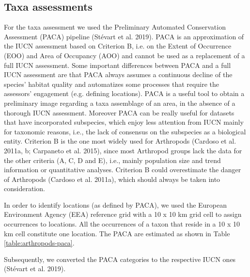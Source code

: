     \subsection{Taxa assessments}
    \label{subsec:arthropods-taxa-assessments}
For the taxa assessment we used the Preliminary Automated Conservation Assessment
(PACA) pipeline (Stévart et al. 2019). PACA is an approximation of the IUCN
assessment based on Criterion B, i.e. on the Extent of Occurrence (EOO) and
Area of Occupancy (AOO) and cannot be used as a replacement of a full IUCN
assessment. Some important differences between PACA and a full IUCN assessment
are that PACA always assumes a continuous decline of the species’ habitat
quality and automatizes some processes that require the assessors' engagement
(e.g. defining locations). PACA is a useful tool to obtain a preliminary image
regarding a taxa assemblage of an area, in the absence of a thorough IUCN assessment.
Moreover PACA can be really useful for datasets that have incorporated subspecies,
which enjoy less attention from IUCN mainly for taxonomic reasons, i.e., the
lack of consensus on the subspecies as a biological entity. Criterion B is the
one most widely used for Arthropods (Cardoso et al. 2011a, b; Carpaneto et al. 2015),
since most Arthropod groups lack the data for the other criteria (A, C, D and E),
i.e., mainly population size and trend information or quantitative analyses.
Criterion B could overestimate the danger of Arthropods (Cardoso et al. 2011a),
which should always be taken into consideration.

In order to identify locations (as defined by PACA), we used the European
Environment Agency (EEA) reference grid with a 10 x 10 km grid cell to assign
occurrences to locations. All the occurrences of a taxon that reside in a
10 x 10 km cell constitute one location. The PACA are estimated as shown in Table \ref{table:arthropods-paca}.

Subsequently, we converted the PACA categories to the respective IUCN ones (Stévart et al. 2019).

